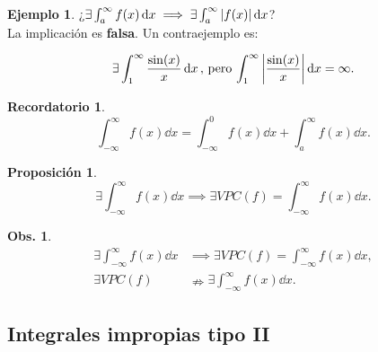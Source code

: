 \documentclass{article}
\theoremstyle{definicion}
\theoremstyle{definition}             %
\theoremstyle{definition}             %
\theoremstyle{definition}
\newtheorem{record}{Recordatorio}
\theoremstyle{definition}
\theoremstyle{observacion}
\newtheorem{obs}{Obs.}
\theoremstyle{definition}
\newtheorem{prop}{Proposición}
\theoremstyle{plain}
\theoremstyle{definition}
\newtheorem{exe}{Ejemplo}
\theoremstyle{afirmacion}
\theoremstyle{definition}
\begin{document}
    \begin{exe}
        ¿\(\exists \int_{a}^{\infty}f(x)\dd{x} \implies \exists \int_{a}^{\infty}\abs{f(x)}\dd{x}\)?\\
        La implicación es \textbf{falsa}. Un contraejemplo es:

        \begin{equation*}
            \exists\int_{1}^{\infty}\dfrac{\sin(x)}{x}\dd{x},\, \text{pero}\, \int_{1}^{\infty}\abs{\dfrac{\sin(x)}{x}}\dd{x} = \infty.
        \end{equation*}
    \end{exe}

    \begin{record}
        \vphantom{jlfjdaksjflkajdf}
        \begin{equation*}
            \int_{-\infty}^{\infty}f(x)\dd{x} = \int_{-\infty}^{0}f(x)\dd{x} + \int_{a}^{\infty}f(x)\dd{x}.
        \end{equation*}
    \end{record}

    \begin{prop}
        \vphantom{faldfhsjfhasjdhfajsf}
        \begin{equation*}
            \exists \int_{-\infty}^{\infty}f(x)\dd{x} \implies \exists VPC(f) = \int_{-\infty}^{\infty}f(x)\dd{x}.
        \end{equation*}
    \end{prop}

    \begin{obs}
        \vphantom{jdflsajfkdjflk}
        \begin{align*}
            \exists \int_{-\infty}^{\infty}f(x)\dd{x} &\implies \exists VPC(f) = \int_{-\infty}^{\infty}f(x)\dd{x},\\
            \exists VPC(f) &\nRightarrow \exists \int_{-\infty}^{\infty}f(x)\dd{x}.
        \end{align*}
    \end{obs}

    \subsection{Integrales impropias tipo II}
    
\end{document}
